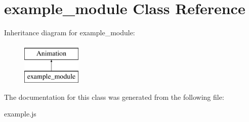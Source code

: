 \hypertarget{classexample__module}{\section{example\-\_\-module Class Reference}
\label{classexample__module}
}
Inheritance diagram for example\-\_\-module\-:\begin{figure}[H]
\begin{center}
\leavevmode
\includegraphics[height=2.000000cm]{classexample__module}
\end{center}
\end{figure}


The documentation for this class was generated from the following file\-:\begin{DoxyCompactItemize}
\item 
example.\-js\end{DoxyCompactItemize}
